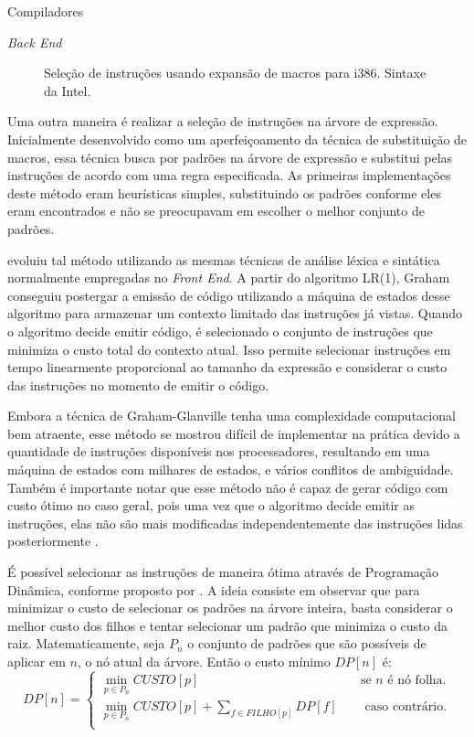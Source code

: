\begin{section}{Compiladores}
\begin{subsection}{\textit{Back End}}
\begin{figure}
\begin{center}
{
}
\end{center}

\caption{Seleção de instruções usando expansão de macros para i386. Sintaxe da Intel.}
\label{fig:macro_exp}
\end{figure}

    Uma outra maneira é realizar a seleção de instruções na árvore de expressão.
Inicialmente desenvolvido como um aperfeiçoamento da técnica de substituição de macros,
essa técnica busca por padrões na árvore de expressão e substitui pelas instruções
de acordo com uma regra especificada.
As primeiras implementações deste método eram heurísticas simples, substituindo os padrões
conforme eles eram encontrados e não se preocupavam em escolher o melhor conjunto de padrões.

\cite{glanville1978} evoluiu tal método utilizando as mesmas técnicas de análise léxica
e sintática normalmente empregadas no \textit{Front End}. A partir do algoritmo LR(1),
Graham conseguiu postergar a emissão de código utilizando a máquina de estados desse
algoritmo para armazenar um contexto limitado das instruções já vistas. Quando o algoritmo decide
emitir código, é selecionado o conjunto de instruções que minimiza o custo total do
contexto atual. Isso permite selecionar instruções em tempo linearmente proporcional ao tamanho
da expressão e considerar o custo das instruções no momento de emitir o código.

Embora a técnica de Graham-Glanville tenha uma
complexidade computacional bem atraente, esse método se
mostrou difícil de implementar na prática devido a quantidade de instruções disponíveis nos
processadores, resultando em uma máquina de estados com milhares de estados, e
vários conflitos de ambiguidade. Também é importante notar que esse método não
é capaz de gerar código com custo ótimo no caso geral, pois uma vez que o
algoritmo decide emitir as instruções, elas não são mais modificadas
independentemente das instruções lidas posteriormente \citep{blindell2016instruction}.

É possível selecionar as instruções de maneira ótima através de Programação
Dinâmica, conforme proposto por \cite{ripken1977formale}.  A ideia consiste em
observar que para minimizar o custo de selecionar os padrões na árvore inteira,
basta considerar o melhor custo dos filhos
e tentar selecionar um padrão que minimiza o custo da raiz. Matematicamente, seja
$P_n$ o conjunto de padrões que são possíveis de aplicar em $n$, o nó atual da árvore.
Então o custo mínimo $DP[n]$ é:
\[
    DP[n] =
     \begin{cases}
       \min_{p \in P_n} CUSTO[p]  &\quad\text{se } n \text{ é nó folha.}\\
       \min_{p \in P_n} CUSTO[p] + \sum_{f \in FILHO[p]} DP[f] &\quad\text{ caso contrário.}\\
     \end{cases}
\]


\end{subsection}
\end{section}
